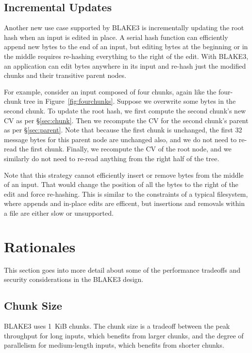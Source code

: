 \documentclass[11pt,notitlepage,a4paper]{article}
\begin{document}
\subsection{Incremental Updates}\label{sec:incrementalupdate}

Another new use case supported by BLAKE3 is incrementally updating the root
hash when an input is edited in place. A serial hash function can efficiently
append new bytes to the end of an input, but editing bytes at the beginning or
in the middle requires re-hashing everything to the right of the edit. With
BLAKE3, an application can edit bytes anywhere in its input and re-hash just
the modified chunks and their transitive parent nodes.

For example, consider an input composed of four chunks, again like the
four-chunk tree in Figure~\ref{fig:fourchunks}. Suppose we overwrite some bytes
in the second chunk. To update the root hash, we first compute the second
chunk's new CV as per \S\ref{sec:chunk}. Then we recompute the CV for the
second chunk's parent as per \S\ref{sec:parent}. Note that because the first
chunk is unchanged, the first 32 message bytes for this parent node are
unchanged also, and we do not need to re-read the first chunk. Finally, we
recompute the CV of the root node, and we similarly do not need to re-read
anything from the right half of the tree.

Note that this strategy cannot efficiently insert or remove bytes from the
middle of an input. That would change the position of all the bytes to the
right of the edit and force re-hashing. This is similar to the constraints of a
typical filesystem, where appends and in-place edits are efficent, but
insertions and removals within a file are either slow or unsupported.

\section{Rationales}\label{sec:rationales}

This section goes into more detail about some of the performance tradeoffs and
security considerations in the BLAKE3 design.

\subsection{Chunk Size}\label{sec:chunksize}

BLAKE3 uses 1~KiB chunks. The chunk size is a tradeoff between the peak
throughput for long inputs, which benefits from larger chunks, and the degree
of parallelism for medium-length inputs, which benefits from shorter chunks.
\end{document}

